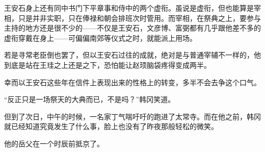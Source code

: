 王安石身上还有同中书门下平章事和侍中的两个虚衔。虽说是虚衔，但也能算是宰相，只是并非实职，只在俸禄和朝会排班次时管用。而宰相，在祭典之上，要参与主持的地方还是很不少的——不仅是王安石，文彦博、富弼都有几乎跟他差不多的虚衔穿戴在身上——可偏偏南郊等仪式之时，就能派上用场。

若是寻常老臣倒也罢了，但以王安石过往的成就，绝对是与普通宰辅不一样的，他到底是站在王珪之上还是之下，恐怕能让赵顼脑袋疼得变成两半。

幸而以王安石这些年在信件上表现出来的性格上的转变，多半不会去争这个口气。

“反正只是一场祭天的大典而已，不是吗？”韩冈笑道。

但到了次日，中午的时候，一名家丁气喘吁吁的跑进了太常寺。而在他之前，韩冈就已经知道究竟发生了什么事，脸上也没有了昨夜那般轻松的微笑。

他的岳父在一个时辰前抵京了。

